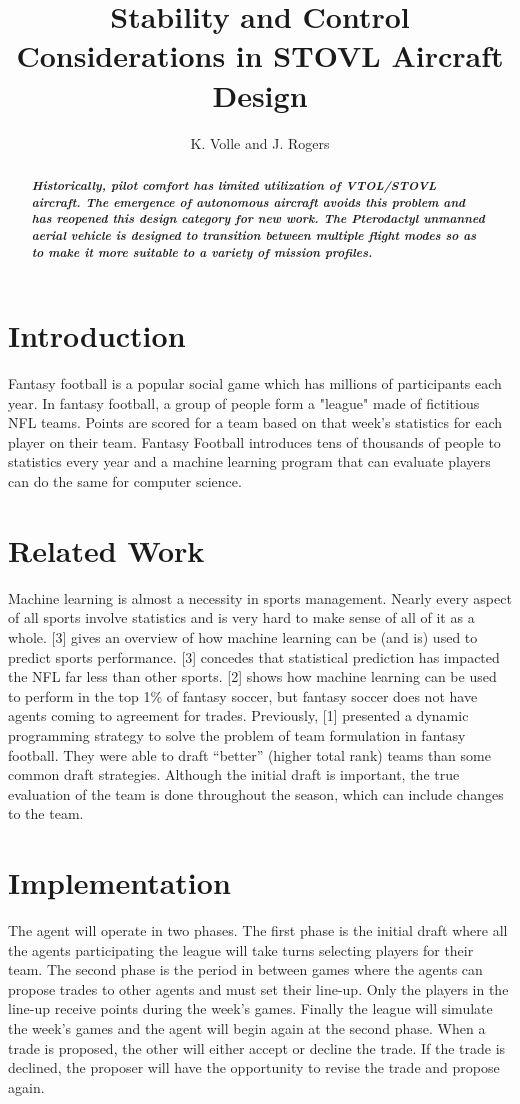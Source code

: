 \documentclass[a4paper,11pt, onecolumn]{article}
\title{\vspace{-80px}Stability and Control Considerations in STOVL Aircraft Design\vspace{-50px}}
\author{K. Volle and J. Rogers}
\date{}%
\begin{document}
\maketitle
\renewcommand{\abstractname}{}
\begin{abstract}
\emph{\textbf{Historically, pilot comfort has limited utilization of VTOL/STOVL aircraft. The emergence of autonomous aircraft avoids this problem and has reopened this design category for new work. The Pterodactyl unmanned aerial vehicle is designed to transition between multiple flight modes so as to make it more suitable to a variety of mission profiles. }}
\end{abstract}

\section{Introduction}
Fantasy football is a popular social game which has millions of participants each year. In fantasy football, a group of people form a "league" made of fictitious NFL teams. Points are scored for a team based on that week’s statistics for each player on their team. Fantasy Football introduces tens of thousands of people to statistics every year and a machine learning program that can evaluate players can do the same for computer science.

\section{Related Work}
Machine learning is almost a necessity in sports management. Nearly every aspect of all sports involve statistics and is very hard to make sense of all of it as a whole. [3] gives an overview of how machine learning can be (and is) used to predict sports performance. [3] concedes that statistical prediction has impacted the NFL far less than other sports. [2] shows how machine learning can be used to perform in the top 1\% of fantasy soccer, but fantasy soccer does not have agents coming to agreement for trades. Previously, [1] presented a dynamic programming strategy to solve the problem of team formulation in fantasy football. They were able to draft “better” (higher total rank) teams than some common draft strategies. Although the initial draft is important, the true evaluation of the team is done throughout the season, which can include changes to the team.

\section{Implementation}
The agent will operate in two phases. The first phase is the initial draft where all the agents participating the league will take turns selecting players for their team. The second phase is the period in between games where the agents can propose trades to other agents and must set their line-up. Only the players in the line-up receive points during the week’s games. Finally the league will simulate the week’s games and the agent will begin again at the second phase. When a trade is proposed, the other will either accept or decline the trade. If the trade is declined, the proposer will have the opportunity to revise the trade and propose again.
\end{document}
